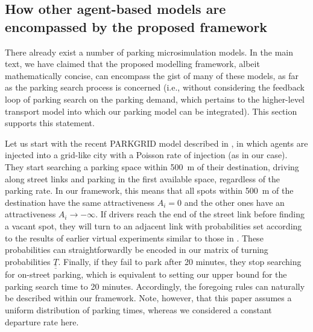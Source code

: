 \documentclass[trsc,reprint]{informs3}
\newcommand{\uul}[1]{\underline{\underline{#1}}}
\newcommand{\AN}[1]{#1}
\begin{document}
\begin{APPENDICES}

\setcounter{equation}{0}
\renewcommand{\theequation}{S\arabic{equation}}
\setcounter{table}{0}
\renewcommand{\thetable}{S\arabic{table}}
\setcounter{figure}{0}
\renewcommand{\thefigure}{S\arabic{figure}}%


\AN{
\section{How other agent-based models are encompassed by the proposed framework}
\label{sec:Appendix_OtherModels}

There already exist a number of parking microsimulation models. In the main text, we have claimed that the proposed modelling framework, albeit mathematically concise, can encompass the gist of many of these models, as far as the parking search process is concerned (i.e., without considering the feedback loop of parking search on the parking demand, which pertains to the higher-level transport model into which our parking model can be integrated). This section supports this statement.

Let us start with the recent PARKGRID model described in \cite{fulman2021approximation}, in which
agents are injected into a grid-like city with a Poisson rate of injection (as in our case). 
They start searching a parking space within 500~m of their destination, driving along street links and parking in the first available space, regardless of the parking rate. In our framework, this
means that all spots within 500~m of the destination have the same attractiveness $A_i=0$ and the other ones have an attractiveness $A_i \to - \infty$. If drivers reach the end of the 
street link before finding a vacant spot, they will turn to an adjacent link with probabilities set according to the results
of earlier virtual experiments similar to those in \cite{fulman2020modeling}. These probabilities
can straightforwardly be encoded in our matrix of turning probabilities $\uul{T}$. Finally,
if they fail to park after 20 minutes, they stop searching for on-street parking, which
is equivalent to setting our upper bound for the parking search time to 20 minutes. Accordingly,
the foregoing rules can naturally be described within our framework. Note, however, that this
paper assumes a uniform distribution of parking times, whereas we considered a constant departure rate here.

}
\end{APPENDICES}
\end{document}
